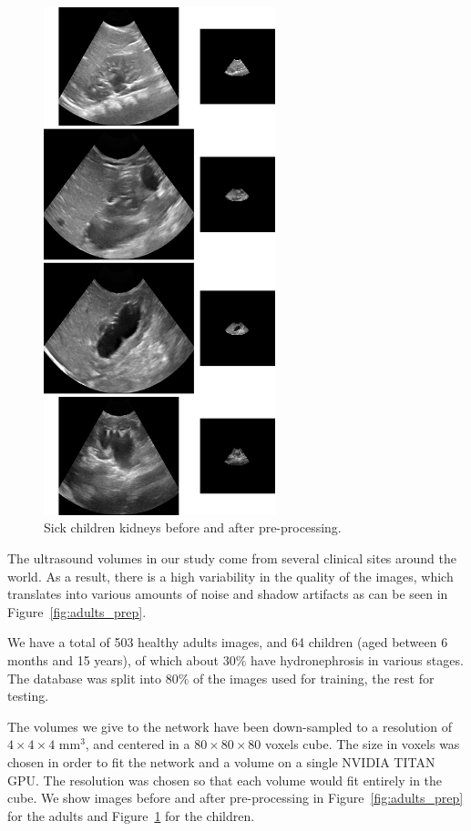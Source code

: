 \begin{figure}[htbp]
    \centering
	\includegraphics[width=0.6\textwidth]{img_transfer/children_prep}
    \caption{Sick children kidneys before and after pre-processing.}
    \label{fig:children_prep}
\end{figure}

The ultrasound volumes in our study come from several clinical sites around the world. As a result, there is a high variability in the quality of the images, which translates into various amounts of noise and shadow artifacts as can be seen in Figure~\ref{fig:adults_prep}. 

We have a total of 503 healthy adults images, and 64 children (aged between 6 months and 15 years), of which about $30 \%$ have hydronephrosis in various stages. The database was split into $80 \%$ of the images used for training, the rest for testing.

The volumes we give to the network have been down-sampled to a resolution of $4 \times 4 \times 4$ mm$^3$, and centered in a $80 \times 80 \times 80$ voxels cube. The size in voxels was chosen in order to fit the network and a volume on a single NVIDIA TITAN GPU. The resolution was chosen so that each volume would fit entirely in the cube. We show images before and after pre-processing in Figure~\ref{fig:adults_prep} for the adults and Figure~\ref{fig:children_prep} for the children.


